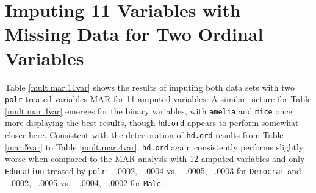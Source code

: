 \documentclass[12pt,econ]{sources/authesis}
\begin{document}
\hypertarget{app-ordmiss-mult-11var}{%
\section{Imputing 11 Variables with Missing Data for Two Ordinal Variables}\label{app-ordmiss-mult-11var}}

Table \ref{mult.mar.11var} shows the results of imputing both data sets with two \texttt{polr}-treated variables MAR for 11 amputed variables. A similar picture for Table \ref{mult.mar.4var} emerges for the binary variables, with \texttt{amelia} and \texttt{mice} once more displaying the best results, though \texttt{hd.ord} appears to perform somewhat closer here. Consistent with the deterioration of \texttt{hd.ord} results from Table \ref{mar.5var} to Table \ref{mult.mar.4var}, \texttt{hd.ord} again consistently performs slightly worse when compared to the MAR analysis with 12 amputed variables and only \texttt{Education} treated by \texttt{polr}: --.0002, --.0004 vs.~--.0005, --.0003 for \texttt{Democrat} and --.0002, --.0005 vs.~--.0004, --.0002 for \texttt{Male}.

\ssp
\end{document}
